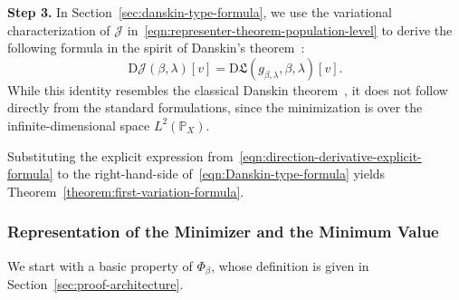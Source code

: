 \documentclass[sn-mathphys-num]{sn-jnl}%
\numberwithin{equation}{section}
\renewcommand{\P}{\mathbb{P}}
\theoremstyle{thmstyleone}%
\theoremstyle{thmstyletwo}%
\theoremstyle{thmstylethree}%
\begin{document}
{\vspace{.8em}
\noindent\noindent
\textbf{Step 3.}
In Section~\ref{sec:danskin-type-formula}, 
we use the variational characterization of $\mathcal{J}$ in~\eqref{eqn:representer-theorem-population-level} to derive the following formula in the spirit of Danskin's theorem~\cite{Danskin67}:
\begin{equation}
\label{eqn:Danskin-type-formula}
\mathrm{D}\mathcal{J}(\beta,\lambda)[v] 
= \mathrm{D} \mathfrak{L}(g_{\beta, \lambda}, \beta, \lambda)[v].
\end{equation}
While this identity resembles the classical Danskin theorem~\cite{Danskin67}, it does not follow directly from the standard formulations, since the minimization is over the infinite-dimensional space $L^2(\P_X)$.

Substituting the explicit expression from~\eqref{eqn:direction-derivative-explicit-formula} to the right-hand-side 
of~\eqref{eqn:Danskin-type-formula}
yields Theorem~\ref{theorem:first-variation-formula}.
}

\subsubsection{Representation of the Minimizer and the Minimum Value}
\label{sec:representation-of-the-minimizer-and-the-minimum-value} 

We start with a basic property of $\Phi_\beta$, whose definition is given in Section~\ref{sec:proof-architecture}.
\vspace{.5em} 
\end{document}
